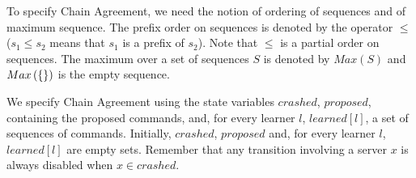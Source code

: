 \begin{comment}
We suppose that each server can play a number of \emph{roles}.
Chain Agreement specifies the allowed behaviors the roles of \emph{proposers}
and \emph{learners}. Proposers receive commands from the clients of the service
and propose them for execution by the replicated service. Each learner learns about
a growing sequence of commands. Thanks to the sequential specification of the
service, a sequence of commands determines an output for each the included commands. 
In a traditional SMR algorithm, servers can also play the role of
\emph{acceptors}, whose task is to collectively order commands and let the
learners know about the latest sequence of ordered commands.

The point of Chain Agreement is to implement a replicated service by having every learner learn about a growing sequence of commands, which
represent an execution of the sequential specification of the service.
Crucially, at all times, the sequences of commands learned by the
different learners must form a chain in the prefix order on sequences.
Moreover, for every command $c$ proposed by a correct proposer, every
correct learner must eventually learn a sequence containing $c$.  Once
a learner learns about a sequence containing a command $c$, it can
determine the output produced by $c$, using the sequential
specification of the service, and respond to the client that issued
the command $c$.
\end{comment}

To specify Chain Agreement, we need the notion of ordering of sequences and of
maximum sequence.  The prefix order on sequences is denoted by the operator
$\leq$ ($s_1 \leq s_2$ means that $s_1$ is a prefix of $s_2$). 
Note that $\leq$ is a partial order on sequences. The maximum over a set of
sequences $S$ is denoted by $Max\left( S \right)$ and $Max\left( \left\{\right\}
\right)$ is the empty sequence.

We specify Chain Agreement using the state variables $crashed$, $proposed$, containing the proposed commands,
and, for every learner $l$,  $learned\left[ l \right]$, a set of
sequences of commands. Initially, $crashed$, $proposed$ and, for every learner $l$,
$learned\left[ l \right]$ are empty sets. 
Remember that any transition involving a server $x$ is always disabled when $x\in crashed$. 


